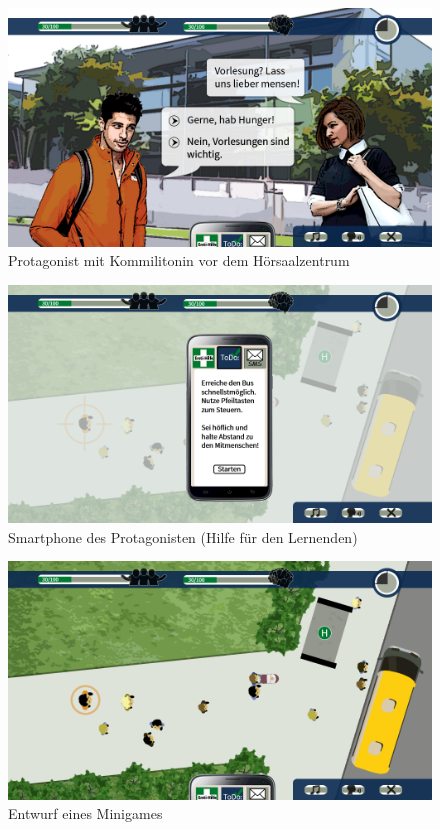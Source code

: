 \documentclass[a4paper,10pt]{article}
\begin{document}
\begin{figure}
	\centering
	\includegraphics[width=\textwidth]{../layout/layout_hsz.png}
	\caption{Protagonist mit Kommilitonin vor dem Hörsaalzentrum}
\end{figure}

\begin{figure}
	\centering
	\includegraphics[width=\textwidth]{../layout/layout_busspiel_menu.png}
	\caption{Smartphone des Protagonisten (Hilfe für den Lernenden)}
\end{figure}

\begin{figure}
	\centering
	\includegraphics[width=\textwidth]{../layout/layout_busspiel.png}
	\caption{Entwurf eines Minigames}
\end{figure}
\end{document}

